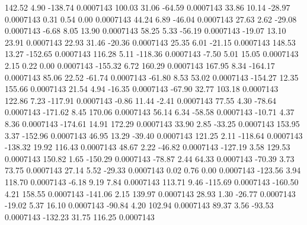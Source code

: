       142.52        4.90     -138.74     0.0007143
      100.03       31.06      -64.59     0.0007143
       33.86       10.14      -28.97     0.0007143
        0.31        0.54        0.00     0.0007143
       44.24        6.89      -46.04     0.0007143
       27.63        2.62      -29.08     0.0007143
       -6.68        8.05       13.90     0.0007143
       58.25        5.33      -56.19     0.0007143
      -19.07       13.10       23.91     0.0007143
       22.93       31.46      -20.36     0.0007143
       25.35        6.01      -21.15     0.0007143
      148.53       13.27     -152.65     0.0007143
      116.28        5.11     -118.36     0.0007143
       -7.50        5.01       15.05     0.0007143
        2.15        0.22        0.00     0.0007143
     -155.32        6.72      160.29     0.0007143
      167.95        8.34     -164.17     0.0007143
       85.06       22.52      -61.74     0.0007143
      -61.80        8.53       53.02     0.0007143
     -154.27       12.35      155.66     0.0007143
       21.54        4.94      -16.35     0.0007143
      -67.90       32.77      103.18     0.0007143
      122.86        7.23     -117.91     0.0007143
       -0.86       11.44       -2.41     0.0007143
       77.55        4.30      -78.64     0.0007143
     -171.62        8.45      170.06     0.0007143
       56.14        6.34      -58.58     0.0007143
      -10.71        4.37        8.36     0.0007143
     -174.61       14.91      172.29     0.0007143
       33.90        2.85      -33.25     0.0007143
      153.95        3.37     -152.96     0.0007143
       46.95       13.29      -39.40     0.0007143
      121.25        2.11     -118.64     0.0007143
     -138.32       19.92      116.43     0.0007143
       48.67        2.22      -46.82     0.0007143
     -127.19        3.58      129.53     0.0007143
      150.82        1.65     -150.29     0.0007143
      -78.87        2.44       64.33     0.0007143
      -70.39        3.73       73.75     0.0007143
       27.14        5.52      -29.33     0.0007143
        0.02        0.76        0.00     0.0007143
     -123.56        3.94      118.70     0.0007143
       -6.18        9.19        7.84     0.0007143
      113.71        9.46     -115.69     0.0007143
     -160.50        4.21      158.55     0.0007143
     -141.06        2.15      139.97     0.0007143
       28.93        1.30      -26.77     0.0007143
      -19.02        5.37       16.10     0.0007143
      -90.84        4.20      102.94     0.0007143
       89.37        3.56      -93.53     0.0007143
     -132.23       31.75      116.25     0.0007143
